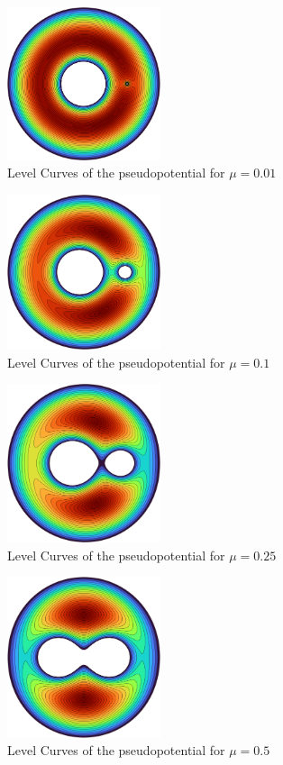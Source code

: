 \documentclass{article}
\begin{document}
\begin{figure}[H]
    \caption{Level Curves of the pseudopotential for $\mu=0.01$}
    \centering
    \includegraphics[width=0.4\textwidth]{level_curves/potential0.01.png}
\end{figure}
\begin{figure}[H]
    \caption{Level Curves of the pseudopotential for $\mu=0.1$}
    \centering
    \includegraphics[width=0.4\textwidth]{level_curves/potential0.1.png}
\end{figure}
\begin{figure}[H]
    \caption{Level Curves of the pseudopotential for $\mu=0.25$}
    \centering
    \includegraphics[width=0.4\textwidth]{level_curves/potential0.25.png}
\end{figure}
\begin{figure}[H]
    \caption{Level Curves of the pseudopotential for $\mu=0.5$}
    \centering
    \includegraphics[width=0.4\textwidth]{level_curves/potential0.5.png}
\end{figure}
\end{document}
